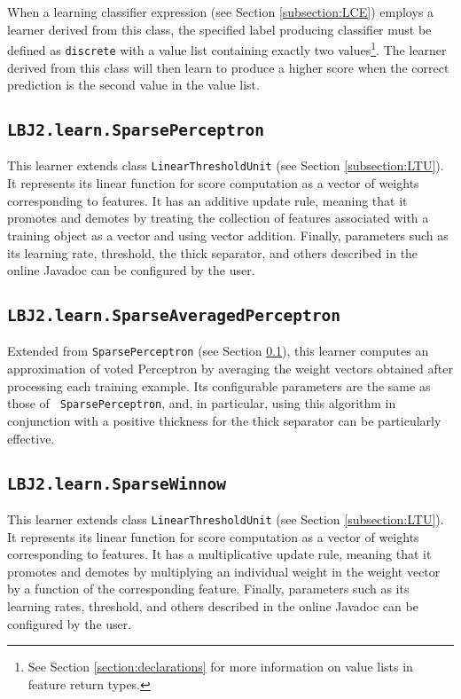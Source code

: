 When a learning classifier expression (see Section \ref{subsection:LCE})
employs a learner derived from this class, the specified label producing
classifier must be defined as {\tt discrete} with a value list containing
exactly two values\footnote{See Section \ref{section:declarations} for more
information on value lists in feature return types.}.  The learner derived
from this class will then learn to produce a higher score when the correct
prediction is the second value in the value list.

\subsection{{\tt LBJ2.learn.SparsePerceptron}} \label{subsection:perceptron}
This learner extends class {\tt LinearThresholdUnit} (see Section
\ref{subsection:LTU}).  It represents its linear function for score
computation as a vector of weights corresponding to features.  It has an
additive update rule, meaning that it promotes and demotes by treating the
collection of features associated with a training object as a vector and using
vector addition.  Finally, parameters such as its learning rate, threshold,
the thick separator, and others described in the online Javadoc can be
configured by the user.

\subsection{{\tt LBJ2.learn.SparseAveragedPerceptron}}
Extended from {\tt SparsePerceptron} (see Section
\ref{subsection:perceptron}), this learner computes an approximation of voted
Perceptron by averaging the weight vectors obtained after processing each
training example.  Its configurable parameters are the same as those of {\tt
SparsePerceptron}, and, in particular, using this algorithm in conjunction
with a positive thickness for the thick separator can be particularly
effective.

\subsection{{\tt LBJ2.learn.SparseWinnow}}
This learner extends class {\tt LinearThresholdUnit} (see Section
\ref{subsection:LTU}).  It represents its linear function for score
computation as a vector of weights corresponding to features.  It has a
multiplicative update rule, meaning that it promotes and demotes by
multiplying an individual weight in the weight vector by a function of the
corresponding feature.  Finally, parameters such as its learning rates,
threshold, and others described in the online Javadoc can be configured by the
user.

